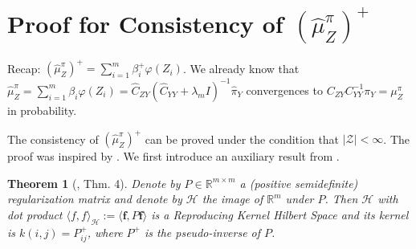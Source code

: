 \documentclass[a4paper]{article}
\renewcommand{\bf}{\mathbf}
\renewcommand{\cal}{\mathcal}
\newcommand{\bb}{\mathbb}
\newtheorem{theorem}{Theorem}
\begin{document}
\section{Proof for Consistency of $(\widehat{\mu}_Z^{\pi})^+$}
Recap: $(\widehat{\mu}_Z^{\pi})^+ = \sum_{i=1}^m \beta_i^+\varphi(Z_i) $. We already know that $\widehat{\mu}_Z^\pi = \sum_{i=1}^m \beta_i \varphi(Z_i) = \widehat{C}_{ZY}(\widehat{C}_{YY}+\lambda_m I)^{-1} \widehat{\pi}_Y$ convergences to $C_{ZY}C_{YY}^{-1}\pi_Y = \mu_Z^\pi$ in probability.

The consistency of $(\widehat{\mu}_Z^\pi)^+$ can be proved under the condition that $|\cal{Z}| < \infty$. The proof was inspired by \cite{grunewalder2012modelling}. We first introduce an auxiliary result from \cite{smola2003kernels}.
\begin{theorem}[\cite{smola2003kernels}, Thm. 4]\label{thm:smola}
Denote by $P\in \mathbb{R}^{m\times m}$ a (positive semidefinite) regularization matrix and denote by $\mathcal{H}$ the image of $\bb{R} ^m$ under $P$. Then $\mathcal{H}$ with dot product $\langle f, f\rangle_{\cal{H}} := \langle \bf{f}, P\bf{f}\rangle$ is a Reproducing Kernel Hilbert Space and its kernel is $k(i,j) = P^+_{ij}$, where $P^+$ is the pseudo-inverse of $P$.
\end{theorem}
\end{document}
